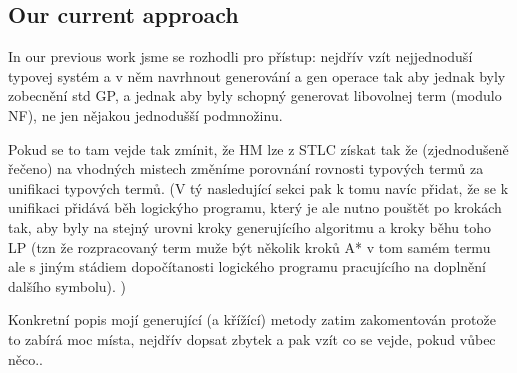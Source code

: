 \documentclass[11pt]{article}
\newcommand{\red}[1]{{\color{red} #1}}
\begin{document}
\begin{article}


\section{Our current approach}

\red{
In our previous work jsme se rozhodli pro přístup: nejdřív vzít nejjednoduší typovej systém a v něm navrhnout generování a gen operace tak aby jednak byly zobecnění std GP, a jednak aby byly schopný generovat libovolnej term (modulo NF), ne jen nějakou jednodušší podmnožinu.

Pokud se to tam vejde tak zmínit, že HM lze z STLC získat tak že (zjednodušeně řečeno) na vhodných mistech změníme porovnání rovnosti typových termů za unifikaci typových termů. (V tý nasledující sekci pak k tomu navíc přidat, že se k unifikaci přidává běh logickýho programu, který je ale nutno pouštět po krokách tak, aby byly na stejný urovni kroky generujícího algoritmu a kroky běhu toho LP (tzn že rozpracovaný term muže být několik kroků A* v tom samém termu ale s jiným stádiem dopočítanosti logického programu pracujícího na doplnění dalšího symbolu). )

Konkretní popis mojí generující (a křížící) metody zatim zakomentován protože to zabírá moc místa, nejdřív dopsat zbytek a pak vzít co se vejde, pokud vůbec něco..}




\end{article}
\end{document}
